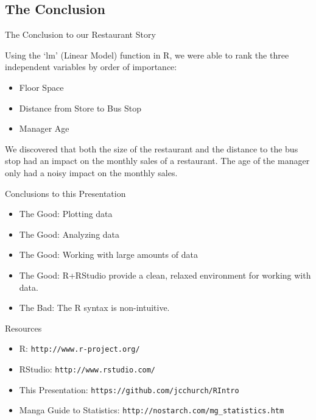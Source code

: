 \documentclass{beamer}
\begin{document}
\subsection{The Conclusion}

\begin{frame}[fragile]{The Conclusion to our Restaurant Story}

Using the `lm' (Linear Model) function in R, we were able to rank the three independent variables by order of importance:

\begin{itemize}
\item Floor Space
\item Distance from Store to Bus Stop
\item Manager Age
\end{itemize}

We discovered that both the size of the restaurant and the distance to the bus stop had an impact on the monthly sales of a restaurant. The age of the manager only had a noisy impact on the monthly sales.

\end{frame}

\begin{frame}{Conclusions to this Presentation}

\begin{itemize}
\item The Good: Plotting data
\item The Good: Analyzing data
\item The Good: Working with large amounts of data
\item The Good: R+RStudio provide a clean, relaxed environment for working with data.
\item The Bad: The R syntax is non-intuitive.
\end{itemize}

\end{frame}

\begin{frame}[fragile]{Resources}

\begin{itemize}
\item R: \verb+http://www.r-project.org/+
\item RStudio: \verb+http://www.rstudio.com/+
\item This Presentation: \verb+https://github.com/jcchurch/RIntro+
\item Manga Guide to Statistics: \verb+http://nostarch.com/mg_statistics.htm+
\end{itemize}

\end{frame}
\end{document}
